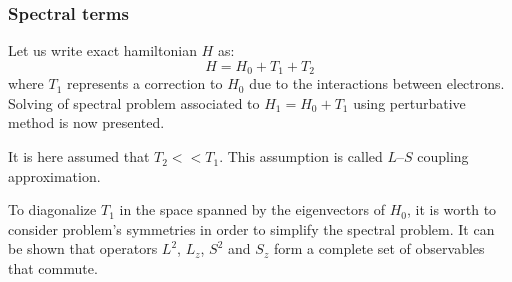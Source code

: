\documentclass[12pt]{book}
\begin{document}
\subsubsection{Spectral terms}
Let us write exact hamiltonian $H$ as:
\begin{equation}
H=H_0+T_1+T_2
\end{equation}
where $T_1$ represents a correction to $H_0$ due to the interactions between
electrons. Solving of spectral problem associated to $H_1=H_0+T_1$ using
perturbative method is now presented.
\begin{rem}
It is here assumed that $T_2<<T_1$. This assumption is called $L$--$S$
coupling approximation.
\end{rem}
To diagonalize $T_1$ in the space spanned by the eigenvectors of $H_0$, it is
worth to consider problem's symmetries in order to simplify the spectral
problem. It can be shown that operators $L^2$, $L_z$,
$S^2$ and
$S_z$ form a complete set of observables that commute.
\end{document}
